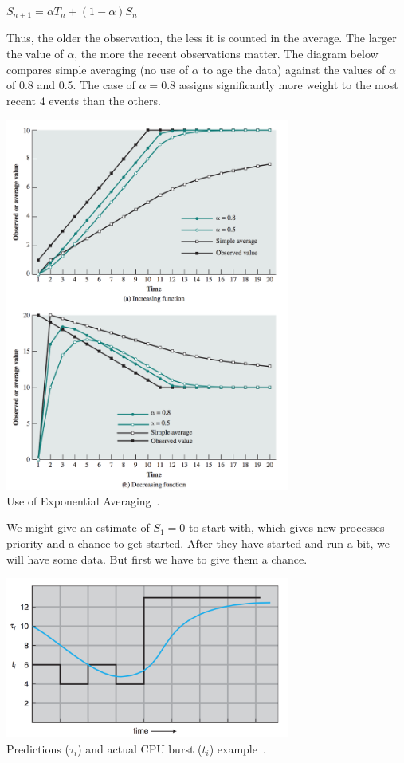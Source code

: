 \begin{center}
$S_{n+1} = \alpha T_{n} + (1 - \alpha) S_{n}$
\end{center}

Thus, the older the observation, the less it is counted in the average. The larger the value of $\alpha$, the more the recent observations matter. The diagram below compares simple averaging (no use of $\alpha$ to age the data) against the values of $\alpha$ of 0.8 and 0.5. The case of $\alpha = 0.8$ assigns significantly more weight to the most recent 4 events than the others.

\begin{center}
	\includegraphics[width=0.7\textwidth]{images/exponential-averaging.png}\\
	Use of Exponential Averaging~\cite{osi}.
\end{center}


We might give an estimate of $S_{1} = 0$ to start with, which gives new processes priority and a chance to get started. After they have started and run a bit, we will have some data. But first we have to give them a chance.

\begin{center}
\includegraphics[width=0.7\textwidth]{images/sjf-2.png}\\
Predictions ($\tau_{i}$) and actual CPU burst ($t_{i}$) example~\cite{osc}.
\end{center}

